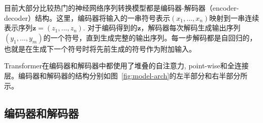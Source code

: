 
目前大部分比较热门的神经网络序列转换模型都是编码器-解码器（encoder-decoder）结构\citep{cho2014learning,bahdanau2014neural,sutskever14}。这里，编码器将输入的一串符号表示$(x_1, ..., x_n)$映射到一串连续表示序列$\mathbf{z} = (z_1, ..., z_n)$. 对于编码得到的$\mathbf{z}$，解码器每次解码生成输出序列$(y_1,...,y_m)$的一个符号，直到生成完整的输出序列。每一步解码都是自回归的\citep{graves2013generating}，也就是在生成下一个符号时将先前生成的符号作为附加输入。


Transformer在编码器和解码器中都使用了堆叠的自注意力, point-wise和全连接层。编码器和解码器的结构分别如图~\ref{fig:model-arch}的左半部分和右半部分所示。

\subsection{编码器和解码器}


